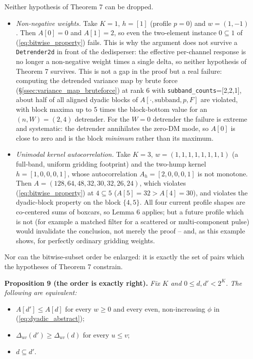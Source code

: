 \documentclass{article}
\numberwithin{equation}{section}   %
\begin{document}
Neither hypothesis of Theorem 7 can be dropped.
\begin{itemize}
\item {\em Non-negative weights.} Take $K=1$, $h=[1]$ (profile $p=0$) and $w = (1,-1)$. Then
$A[0]=0$ and $A[1]=2$, so even the two-element instance $0 \subseteq 1$ of
(\ref{eq:bitwise_property}) fails. This is why the argument does not survive a
{\tt Detrender2d} in front of the dedisperser: the effective per-channel response is no longer
a non-negative weight times a single delta, so neither hypothesis of Theorem 7 survives. This
is not a gap in the proof but a real failure: computing the detrended variance map by brute
force (\S\ref{ssec:variance_map_bruteforce}) at rank 6 with {\tt subband\_counts}=[2,2,1],
about half of all aligned dyadic blocks of $A[\cdot,\mbox{subband},p,F]$ are violated, with
block maxima up to 5 times the block-bottom value for an $(n,W)=(2,4)$ detrender. For the
$W=0$ detrender the failure is extreme and systematic: the detrender annihilates the zero-DM
mode, so $A[0]$ is close to zero and is the block {\em minimum} rather than its maximum.
\item {\em Unimodal kernel autocorrelation.} Take $K=3$, $w=(1,1,1,1,1,1,1,1)$ (a full-band,
uniform gridding footprint) and the two-hump kernel $h = [1,0,0,0,1]$, whose autocorrelation
$A_h = [2,0,0,0,1]$ is not monotone. Then $A = (128,64,48,32,30,32,26,24)$, which violates
(\ref{eq:bitwise_property}) at $4 \subseteq 5$ ($A[5] = 32 > A[4] = 30$), and violates the
dyadic-block property on the block $\{4,5\}$. All four current profile shapes are co-centered
sums of boxcars, so Lemma 6 applies; but a future profile which is not (for example a matched
filter for a scattered or multi-component pulse) would invalidate the conclusion, not merely
the proof -- and, as this example shows, for perfectly ordinary gridding weights.
\end{itemize}

Nor can the bitwise-subset order be enlarged: it is exactly the set of pairs which the
hypotheses of Theorem 7 constrain.

\medskip
\par\noindent
{\bf Proposition 9 (the order is exactly right).}
{\em Fix $K$ and $0 \le d, d' < 2^K$. The following are equivalent:}
\begin{itemize}
\item[(i)] $A[d'] \le A[d]$ for every $w \ge 0$ and every even, non-increasing $\phi$ in
(\ref{eq:dyadic_abstract});
\item[(ii)] $\Delta_{uv}(d') \ge \Delta_{uv}(d)$ for every $u \le v$;
\item[(iii)] $d \subseteq d'$.
\end{itemize}
\end{document}
